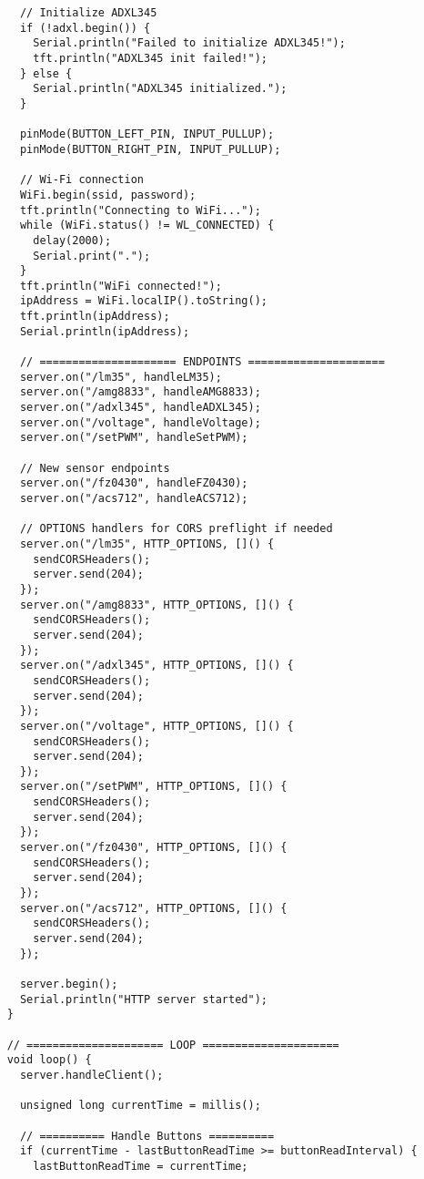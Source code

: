 \begin{verbatim}
      // Initialize ADXL345
      if (!adxl.begin()) {
        Serial.println("Failed to initialize ADXL345!");
        tft.println("ADXL345 init failed!");
      } else {
        Serial.println("ADXL345 initialized.");
      }
    
      pinMode(BUTTON_LEFT_PIN, INPUT_PULLUP);
      pinMode(BUTTON_RIGHT_PIN, INPUT_PULLUP);
    
      // Wi-Fi connection
      WiFi.begin(ssid, password);
      tft.println("Connecting to WiFi...");
      while (WiFi.status() != WL_CONNECTED) {
        delay(2000);
        Serial.print(".");
      }
      tft.println("WiFi connected!");
      ipAddress = WiFi.localIP().toString();
      tft.println(ipAddress);
      Serial.println(ipAddress);
    
      // ===================== ENDPOINTS =====================
      server.on("/lm35", handleLM35);
      server.on("/amg8833", handleAMG8833);
      server.on("/adxl345", handleADXL345);
      server.on("/voltage", handleVoltage);
      server.on("/setPWM", handleSetPWM);
    
      // New sensor endpoints
      server.on("/fz0430", handleFZ0430);
      server.on("/acs712", handleACS712);
    
      // OPTIONS handlers for CORS preflight if needed
      server.on("/lm35", HTTP_OPTIONS, []() {
        sendCORSHeaders();
        server.send(204);
      });
      server.on("/amg8833", HTTP_OPTIONS, []() {
        sendCORSHeaders();
        server.send(204);
      });
      server.on("/adxl345", HTTP_OPTIONS, []() {
        sendCORSHeaders();
        server.send(204);
      });
      server.on("/voltage", HTTP_OPTIONS, []() {
        sendCORSHeaders();
        server.send(204);
      });
      server.on("/setPWM", HTTP_OPTIONS, []() {
        sendCORSHeaders();
        server.send(204);
      });
      server.on("/fz0430", HTTP_OPTIONS, []() {
        sendCORSHeaders();
        server.send(204);
      });
      server.on("/acs712", HTTP_OPTIONS, []() {
        sendCORSHeaders();
        server.send(204);
      });
    
      server.begin();
      Serial.println("HTTP server started");
    }
    
    // ===================== LOOP =====================
    void loop() {
      server.handleClient();
    
      unsigned long currentTime = millis();
    
      // ========== Handle Buttons ==========
      if (currentTime - lastButtonReadTime >= buttonReadInterval) {
        lastButtonReadTime = currentTime;
    

\end{verbatim}
